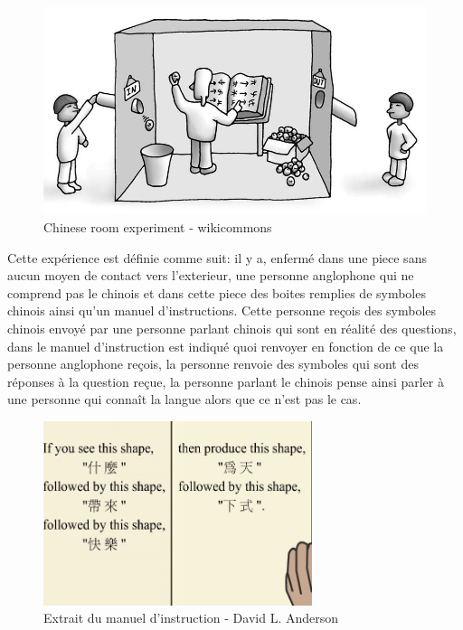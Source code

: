 \begin{figure}[H]
    \centering
    \includegraphics[width=1\textwidth]{Images/chineseroom}
    \caption{Chinese room experiment - wikicommons}
	\label{fig:chineseroom}
\end{figure}

Cette expérience est définie comme suit: \newline
il y a, enfermé dans une piece sans aucun moyen de contact vers l'exterieur, une personne anglophone qui ne comprend
pas le chinois et dans cette piece des boites remplies de symboles chinois ainsi qu'un manuel d'instructions.
Cette personne reçois des symboles chinois envoyé par une personne parlant chinois qui sont en réalité des questions,
dans le manuel d'instruction est indiqué quoi renvoyer en fonction de ce que la personne anglophone reçois,
la personne renvoie des symboles qui sont des réponses à la question reçue, la personne parlant le chinois
pense ainsi parler à une personne qui connaît la langue alors que ce n'est pas le cas.
\newpage

\begin{figure}[H]
    \centering
    \includegraphics[width=0.7\textwidth]{Images/chineserule}
    \caption{Extrait du manuel d'instruction - David L. Anderson}
	\label{fig:chineseroom}
\end{figure}

